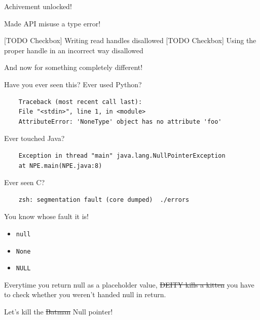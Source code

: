 \documentclass{beamer}
\begin{document}
\begin{frame}{Achivement unlocked!}
  \begin{center}
    {\Huge Made API misuse a type error!}
  \end{center}
  [TODO Checkbox] Writing read handles disallowed
  [TODO Checkbox] Using the proper handle in an incorrect way disallowed
\end{frame}

\begin{frame}
  \begin{center}
    {\Huge And now for something completely different!}
  \end{center}
\end{frame}

\begin{frame}[fragile]{Have you ever seen this?}
  Ever used Python?
  \begin{verbatim}
    Traceback (most recent call last):
    File "<stdin>", line 1, in <module>
    AttributeError: 'NoneType' object has no attribute 'foo'
  \end{verbatim}
  \pause
  Ever touched Java?
  \begin{verbatim}
    Exception in thread "main" java.lang.NullPointerException
    at NPE.main(NPE.java:8)
  \end{verbatim}
  \pause
  Ever seen C?
  \begin{verbatim}
    zsh: segmentation fault (core dumped)  ./errors
  \end{verbatim}
\end{frame}

\begin{frame}{You know whose fault it is!}
  \begin{itemize}
    \item \texttt{null}
    \item \texttt{None}
    \item \texttt{NULL}
  \end{itemize}
  \pause
  Everytime you return null as a placeholder value, 
  \sout{\textdollar{}DEITY kills a kitten}
  you have to check whether you weren't handed null in return.
\end{frame}

\begin{frame}
  \begin{center}
    {\Huge Let's kill the \sout{Batman} Null pointer!}
  \end{center}
\end{frame}
\end{document}
